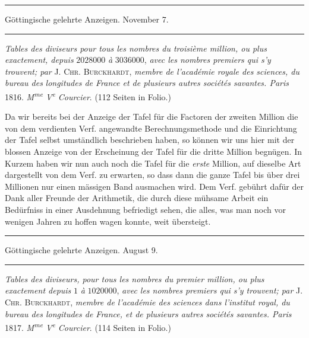 \begin{center}
\rule{.86\linewidth}{.3pt}\par
Göttingische gelehrte Anzeigen. November 7.\par
\rule{.86\linewidth}{.3pt}
\end{center}
\emph{Tables des diviseurs pour tous les nombres du troisième million, ou plus exactement, depuis} $2028000$ \emph{à} $3036000$, \emph{avec les nombres premiers qui s'y trouvent; par} \textsc{J. Chr. Burckhardt}, \emph{membre de l'académie royale des sciences, du bureau des }
\emph{longitudes de France et de plusieurs autres sociétés savantes. Paris} 1816. \emph{M\textsuperscript{me} V\textsuperscript{e} Courcier}. (112 Seiten in Folio.)

Da wir bereits bei der Anzeige der Tafel für die Factoren der zweiten Million die von dem verdienten Verf. angewandte Berechnungsmethode und die Einrichtung der Tafel selbst umständlich beschrieben haben, so können wir uns hier mit der blossen Anzeige von der Erscheinung der Tafel für die dritte Million begnügen. In Kurzem haben wir nun auch noch die Tafel für die \emph{erste} Million, auf dieselbe Art dargestellt von dem Verf. zu erwarten, so dass dann die ganze Tafel bis über drei Millionen nur einen mässigen Band ausmachen wird. Dem Verf. gebührt dafür der Dank aller Freunde der Arithmetik, die durch diese mühsame Arbeit ein Bedürfniss in einer Ausdehnung befriedigt sehen, die alles, was man noch vor wenigen Jahren zu hoffen wagen konnte, weit übersteigt.

\begin{center}
\rule{.86\linewidth}{.3pt}\par
Göttingische gelehrte Anzeigen. August 9.\par
\rule{.86\linewidth}{.3pt}
\end{center}
\emph{Tables des diviseurs, pour tous les nombres du premier million, ou plus exactement depuis} $1$ \emph{à} $1020000$, \emph{avec les nombres premiers qui s'y trouvent; par} \textsc{J. Chr. Burckhardt}, \emph{membre de l'académie des sciences dans l'institut royal, du bureau des longitudes de France, et de plusieurs autres sociétés savantes. Paris} 1817. \emph{M\textsuperscript{me} V\textsuperscript{e} Courcier}. (114 Seiten in Folio.)

